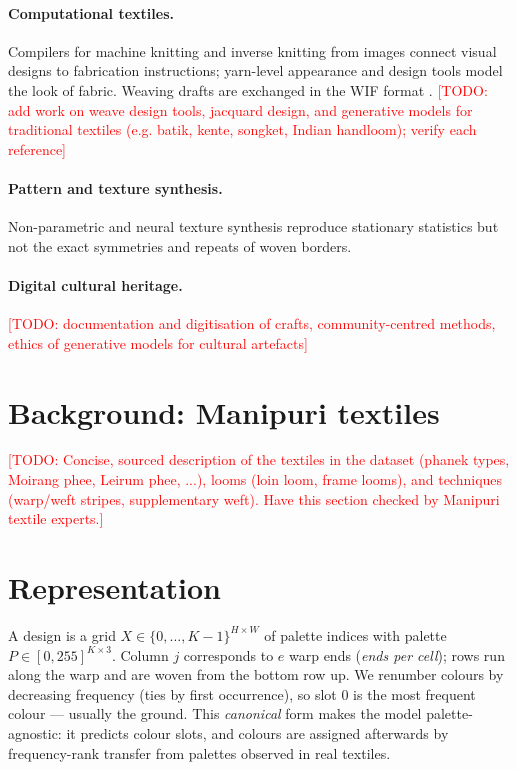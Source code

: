 \documentclass[11pt]{article}
\newcommand{\todo}[1]{\textcolor{red}{[TODO: #1]}}
\begin{document}
\paragraph{Computational textiles.}
Compilers for machine knitting \cite{mccann2016compiler,narayanan2018automatic} and inverse
knitting from images \cite{kaspar2019neural} connect visual designs to fabrication instructions;
yarn-level appearance and design tools \cite{zhao2011building,irawan2012specular,leaf2018interactive}
model the look of fabric. Weaving drafts are exchanged in the WIF format \cite{wif1997}.
\todo{add work on weave design tools, jacquard design, and generative models for traditional
textiles (e.g. batik, kente, songket, Indian handloom); verify each reference}

\paragraph{Pattern and texture synthesis.}
Non-parametric \cite{efros1999texture} and neural \cite{gatys2015texture} texture synthesis
reproduce stationary statistics but not the exact symmetries and repeats of woven borders.

\paragraph{Digital cultural heritage.}
\todo{documentation and digitisation of crafts, community-centred methods, ethics of generative
models for cultural artefacts}

\section{Background: Manipuri textiles}
\todo{Concise, sourced description of the textiles in the dataset (phanek types, Moirang phee,
Leirum phee, ...), looms (loin loom, frame looms), and techniques (warp/weft stripes,
supplementary weft). Have this section checked by Manipuri textile experts.}

\section{Representation}
\label{sec:representation}

A design is a grid $X \in \{0,\dots,K-1\}^{H\times W}$ of palette indices with palette
$P \in [0,255]^{K\times 3}$. Column $j$ corresponds to $e$ warp ends (\emph{ends per cell}); rows run
along the warp and are woven from the bottom row up. We renumber colours by decreasing frequency
(ties by first occurrence), so slot $0$ is the most frequent colour --- usually the ground. This
\emph{canonical} form makes the model palette-agnostic: it predicts colour slots, and colours are
assigned afterwards by frequency-rank transfer from palettes observed in real textiles.
\end{document}
